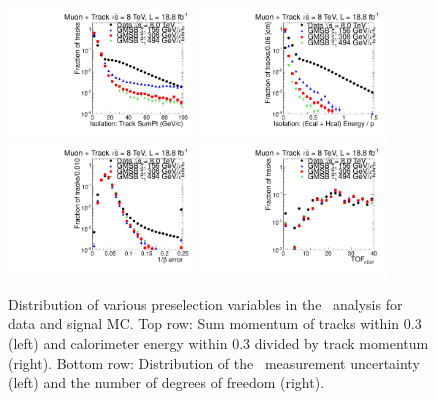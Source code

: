 \begin{figure}
\centering
  \includegraphics[clip=true, trim=0.0cm 0cm 2.8cm 0cm, width=0.44\textwidth]{figures/tkmu/Selection_Comp_8TeV_GMStau_IsolT_BS}
  \includegraphics[clip=true, trim=0.0cm 0cm 2.8cm 0cm, width=0.44\textwidth]{figures/tkmu/Selection_Comp_8TeV_GMStau_IsolE_BS} \\
  \includegraphics[clip=true, trim=0.0cm 0cm 2.8cm 0cm, width=0.44\textwidth]{figures/tkmu/Selection_Comp_8TeV_GMStau_TOFError_BS}
  \includegraphics[clip=true, trim=0.0cm 0cm 2.8cm 0cm, width=0.44\textwidth]{figures/tkmu/Selection_Comp_8TeV_GMStau_nDof_BS}
  \caption[Distribution of tracker and calorimeter isolation as well as the \invbeta\ measurement number of degrees of freedom and uncertainty
in the \tktof\ analysis for data and signal MC.]
{Distribution of various preselection variables in the \tktof\ analysis for data and signal MC.
Top row: Sum momentum of tracks within 0.3 (left) and calorimeter energy within 0.3 divided by track momentum (right).
Bottom row: Distribution of the \invbeta\ measurement uncertainty (left) and the number of degrees of freedom (right).}
    \label{fig:TkMuPreselC}
\end{figure}

